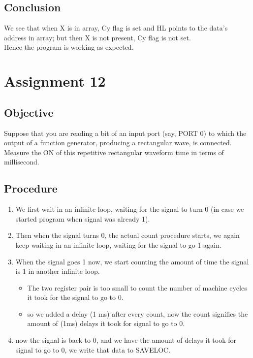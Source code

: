 \documentclass[a4paper]{article} %
\begin{document}
    \subsection{Conclusion}
        We see that when X is in array, Cy flag is set and HL points to the data's address in array; but then X is not present, Cy flag is not set.\\
        Hence the program is working as expected.
\newpage

\section[Time Period of a rectangular waveform signal]{Assignment 12} %
    \subsection{Objective}
    Suppose that you are reading a bit of an input port (say, PORT 0) to which the output of a function generator, producing a rectangular wave, is connected. Measure the ON  of this repetitive rectangular waveform time in terms of millisecond.
    \subsection{Procedure}
        \begin{enumerate}
            \item We first wait in an infinite loop, waiting for the signal to turn 0 (in case we started program when signal was already 1).
            \item Then when the signal turns 0, the actual count procedure starts, we again keep waiting in an infinite loop, waiting for the signal to go 1 again.
            \item When the signal goes 1 now, we start counting the amount of time the signal is 1 in another infinite loop.
                \begin{itemize}
                    \item The two register pair is too small to count the number of machine cycles it took for the signal to go to 0.
                    \item so we added a delay (1 ms) after every count, now the count signifies the amount of (1ms) delays it took for signal to go to 0.
                \end{itemize}
            \item now the signal is back to 0, and we have the amount of delays it took for signal to go to 0, we write that data to SAVELOC.
        \end{enumerate}
\end{document}
